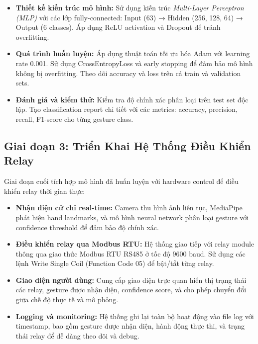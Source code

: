 \documentclass[12pt]{article}
\begin{document}
\begin{itemize}
    \item \textbf{Thiết kế kiến trúc mô hình:}  
    Sử dụng kiến trúc \textit{Multi-Layer Perceptron (MLP)} với các lớp fully-connected: Input (63) → Hidden (256, 128, 64) → Output (6 classes). Áp dụng ReLU activation và Dropout để tránh overfitting.

    \item \textbf{Quá trình huấn luyện:}  
    Áp dụng thuật toán tối ưu hóa Adam với learning rate 0.001. Sử dụng CrossEntropyLoss và early stopping để đảm bảo mô hình không bị overfitting. Theo dõi accuracy và loss trên cả train và validation sets.

    \item \textbf{Đánh giá và kiểm thử:}  
    Kiểm tra độ chính xác phân loại trên test set độc lập. Tạo classification report chi tiết với các metrics: accuracy, precision, recall, F1-score cho từng gesture class.
\end{itemize}

\subsection{Giai đoạn 3: Triển Khai Hệ Thống Điều Khiển Relay}
Giai đoạn cuối tích hợp mô hình đã huấn luyện với hardware control để điều khiển relay thời gian thực:

\begin{itemize}
    \item \textbf{Nhận diện cử chỉ real-time:}  
    Camera thu hình ảnh liên tục, MediaPipe phát hiện hand landmarks, và mô hình neural network phân loại gesture với confidence threshold để đảm bảo độ chính xác.

    \item \textbf{Điều khiển relay qua Modbus RTU:}  
    Hệ thống giao tiếp với relay module thông qua giao thức Modbus RTU RS485 ở tốc độ 9600 baud. Sử dụng các lệnh Write Single Coil (Function Code 05) để bật/tắt từng relay.

    \item \textbf{Giao diện người dùng:}  
    Cung cấp giao diện trực quan hiển thị trạng thái các relay, gesture được nhận diện, confidence score, và cho phép chuyển đổi giữa chế độ thực tế và mô phỏng.

    \item \textbf{Logging và monitoring:}  
    Hệ thống ghi lại toàn bộ hoạt động vào file log với timestamp, bao gồm gesture được nhận diện, hành động thực thi, và trạng thái relay để dễ dàng theo dõi và debug.
\end{itemize}
\end{document}

